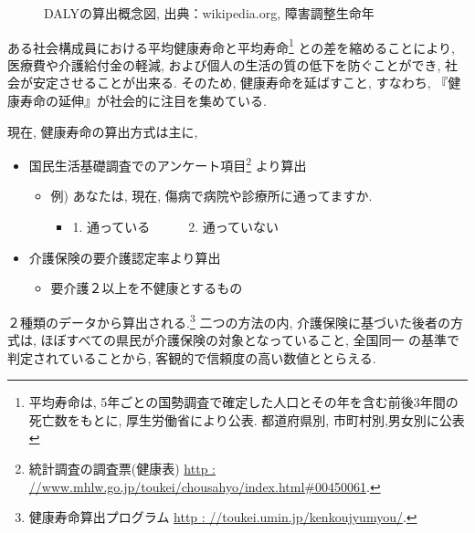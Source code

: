 \begin{figure}[h!]
	\begin{center}
		\caption{DALYの算出概念図, 出典：wikipedia.org, 障害調整生命年
		}
	\end{center}
\end{figure}



ある社会構成員における平均健康寿命と平均寿命\footnote{平均寿命は, 5年ごとの国勢調査で確定した人口とその年を含む前後3年間の死亡数をもとに, 厚生労働省により公表. 都道府県別, 市町村別,男女別に公表
}
との差を縮めることにより, 医療費や介護給付金の軽減, および個人の生活の質の低下を防ぐことができ, 社会が安定させることが出来る.
そのため, 健康寿命を延ばすこと, すなわち, 『健康寿命の延伸』が社会的に注目を集めている.
%

現在, 健康寿命の算出方式は主に,
\begin{itemize} \setlength{\itemsep}{-0.5mm} \setlength{\parskip}{-0.5mm}
	\item 国民生活基礎調査でのアンケート項目\footnote{
		      統計調査の調査票(健康表)
		      \url{http : //www.mhlw.go.jp/toukei/chousahyo/index.html#00450061}.
	      }
	      より算出
	      \begin{itemize} \setlength{\itemsep}{-0.5mm} \setlength{\parskip}{-0.5mm}
		      \item 例) あなたは, 現在, 傷病で病院や診療所に通ってますか.
		            \begin{itemize} \setlength{\itemsep}{-0.5mm} \setlength{\parskip}{-0.5mm}
			            \item[] 1. 通っている~~~~~~2. 通っていない
		            \end{itemize}
	      \end{itemize}

	\item 介護保険の要介護認定率より算出
	      \begin{itemize} \setlength{\itemsep}{-0.5mm} \setlength{\parskip}{-0.5mm}
		      \item 要介護２以上を不健康とするもの
	      \end{itemize}
\end{itemize}
２種類のデータから算出される.\footnote{
	健康寿命算出プログラム
	\url{http : //toukei.umin.jp/kenkoujyumyou/}.
}
二つの方法の内, 介護保険に基づいた後者の方式は,
ほぼすべての県民が介護保険の対象となっていること, 全国同一
の基準で判定されていることから, 客観的で信頼度の高い数値ととらえる.




